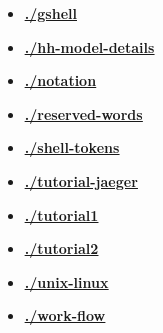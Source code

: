 \documentclass[12pt]{article}
\begin{document}
\begin{itemize}
\item \href{.././gshell/./gshell.pdf}{\bf \underline{./gshell}}

\item \href{.././hh-model-details/./hh-model-details.pdf}{\bf \underline{./hh-model-details}}

\item \href{.././notation/./notation.pdf}{\bf \underline{./notation}}

\item \href{.././reserved-words/./reserved-words.pdf}{\bf \underline{./reserved-words}}

\item \href{.././shell-tokens/./shell-tokens.pdf}{\bf \underline{./shell-tokens}}

\item \href{.././tutorial-jaeger/./tutorial-jaeger.pdf}{\bf \underline{./tutorial-jaeger}}

\item \href{.././tutorial1/./tutorial1.pdf}{\bf \underline{./tutorial1}}

\item \href{.././tutorial2/./tutorial2.pdf}{\bf \underline{./tutorial2}}

\item \href{.././unix-linux/./unix-linux.pdf}{\bf \underline{./unix-linux}}

\item \href{.././work-flow/./work-flow.pdf}{\bf \underline{./work-flow}}


\end{itemize}

\end{document}
